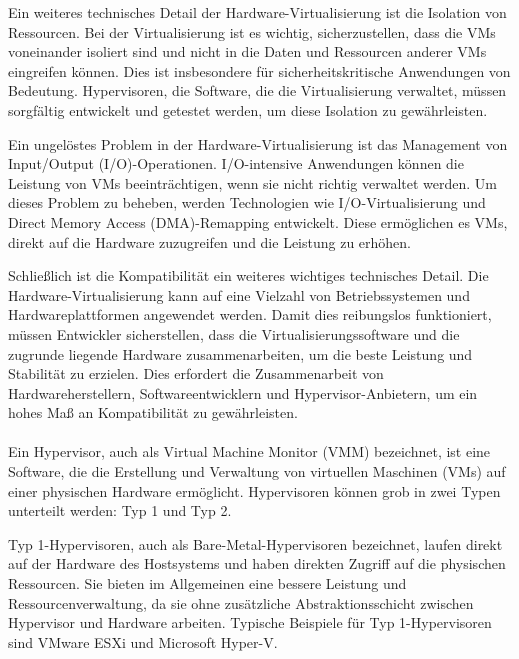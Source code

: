 Ein weiteres technisches Detail der Hardware-Virtualisierung ist die Isolation von Ressourcen. Bei der Virtualisierung ist es wichtig, sicherzustellen, dass die VMs voneinander isoliert sind und nicht in die Daten und Ressourcen anderer VMs eingreifen können. Dies ist insbesondere für sicherheitskritische Anwendungen von Bedeutung. Hypervisoren, die Software, die die Virtualisierung verwaltet, müssen sorgfältig entwickelt und getestet werden, um diese Isolation zu gewährleisten.

Ein ungelöstes Problem in der Hardware-Virtualisierung ist das Management von Input/Output (I/O)-Operationen. I/O-intensive Anwendungen können die Leistung von VMs beeinträchtigen, wenn sie nicht richtig verwaltet werden. Um dieses Problem zu beheben, werden Technologien wie I/O-Virtualisierung und Direct Memory Access (DMA)-Remapping entwickelt. Diese ermöglichen es VMs, direkt auf die Hardware zuzugreifen und die Leistung zu erhöhen.

Schließlich ist die Kompatibilität ein weiteres wichtiges technisches Detail. Die Hardware-Virtualisierung kann auf eine Vielzahl von Betriebssystemen und Hardwareplattformen angewendet werden. Damit dies reibungslos funktioniert, müssen Entwickler sicherstellen, dass die Virtualisierungssoftware und die zugrunde liegende Hardware zusammenarbeiten, um die beste Leistung und Stabilität zu erzielen. Dies erfordert die Zusammenarbeit von Hardwareherstellern, Softwareentwicklern und Hypervisor-Anbietern, um ein hohes Maß an Kompatibilität zu gewährleisten. 
\\\\
Ein Hypervisor, auch als Virtual Machine Monitor (VMM) bezeichnet, ist eine Software, die die Erstellung und Verwaltung von virtuellen Maschinen (VMs) auf einer physischen Hardware ermöglicht. Hypervisoren können grob in zwei Typen unterteilt werden: Typ 1 und Typ 2.

Typ 1-Hypervisoren, auch als Bare-Metal-Hypervisoren bezeichnet, laufen direkt auf der Hardware des Hostsystems und haben direkten Zugriff auf die physischen Ressourcen. Sie bieten im Allgemeinen eine bessere Leistung und Ressourcenverwaltung, da sie ohne zusätzliche Abstraktionsschicht zwischen Hypervisor und Hardware arbeiten. Typische Beispiele für Typ 1-Hypervisoren sind VMware ESXi und Microsoft Hyper-V.


